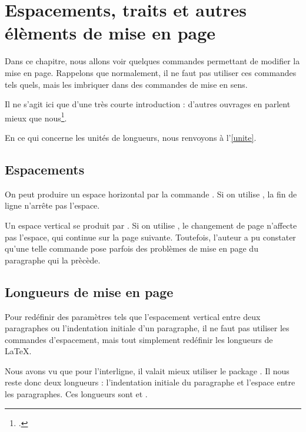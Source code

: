 \chapter{Espacements, traits et autres élèments de mise en page}

\begin{prealable}
Dans ce chapitre, nous allons voir quelques commandes permettant de modifier la mise en page.
Rappelons que normalement, il ne faut pas utiliser ces commandes tels quels, mais les imbriquer dans des commandes de mise en sens.

Il ne s'agit ici que d'une très courte introduction : d'autres ouvrages en parlent mieux que nous\footcites(En particulier)(){frama}{latex_graphic_companion}.

En ce qui concerne les unités de longueurs, nous renvoyons à l'\ref{unite}.
\end{prealable}

\section{Espacements}\label{espace}

On peut produire un espace horizontal par la commande . Si on utilise , la fin de ligne n'arrête pas l'espace.

Un espace vertical se produit par . Si on utilise , le changement de page n'affecte pas  l'espace, qui continue sur la page suivante. Toutefois, l'auteur a pu constater qu'une telle commande pose parfois des problèmes de mise en page du paragraphe qui la prècède.



\section{Longueurs de mise en page}

Pour redéfinir des paramètres tels que l'espacement vertical entre deux paragraphes ou l'indentation initiale d'un paragraphe, il ne faut pas utiliser les commandes d'espacement, mais tout simplement redéfinir les longueurs de \LaTeX. 

Nous avons vu que pour l'interligne, il valait mieux utiliser le package . Il nous reste donc deux longueurs : l'indentation initiale du paragraphe et l'espace entre les paragraphes. Ces longueurs sont  et .

